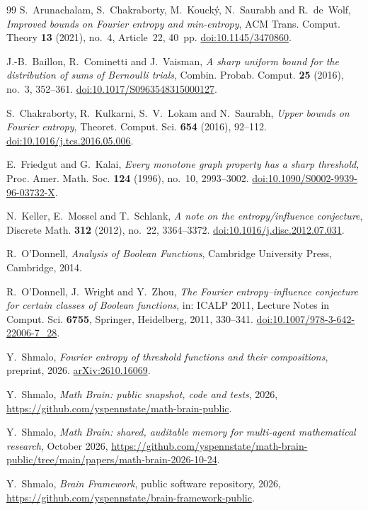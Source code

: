 \documentclass[11pt]{amsart}
\theoremstyle{definition}
\theoremstyle{remark}
\begin{document}
\begin{thebibliography}{99}
S.~Arunachalam, S.~Chakraborty, M.~Kouck\'y, N.~Saurabh and R.~de~Wolf,
\emph{Improved bounds on Fourier entropy and min-entropy},
ACM Trans. Comput. Theory \textbf{13} (2021), no.~4, Article~22, 40~pp.
\href{https://doi.org/10.1145/3470860}{doi:10.1145/3470860}.

J.-B.~Baillon, R.~Cominetti and J.~Vaisman,
\emph{A sharp uniform bound for the distribution of sums of Bernoulli trials},
Combin. Probab. Comput. \textbf{25} (2016), no.~3, 352--361.
\href{https://doi.org/10.1017/S0963548315000127}{doi:10.1017/S0963548315000127}.

S.~Chakraborty, R.~Kulkarni, S.~V.~Lokam and N.~Saurabh,
\emph{Upper bounds on Fourier entropy},
Theoret. Comput. Sci. \textbf{654} (2016), 92--112.
\href{https://doi.org/10.1016/j.tcs.2016.05.006}{doi:10.1016/j.tcs.2016.05.006}.

E.~Friedgut and G.~Kalai,
\emph{Every monotone graph property has a sharp threshold},
Proc. Amer. Math. Soc. \textbf{124} (1996), no.~10, 2993--3002.
\href{https://doi.org/10.1090/S0002-9939-96-03732-X}{doi:10.1090/S0002-9939-96-03732-X}.

N.~Keller, E.~Mossel and T.~Schlank,
\emph{A note on the entropy/influence conjecture},
Discrete Math. \textbf{312} (2012), no.~22, 3364--3372.
\href{https://doi.org/10.1016/j.disc.2012.07.031}{doi:10.1016/j.disc.2012.07.031}.

R.~O'Donnell,
\emph{Analysis of Boolean Functions},
Cambridge University Press, Cambridge, 2014.

R.~O'Donnell, J.~Wright and Y.~Zhou,
\emph{The Fourier entropy--influence conjecture for certain classes of Boolean functions},
in: ICALP 2011, Lecture Notes in Comput. Sci. \textbf{6755}, Springer, Heidelberg, 2011, 330--341.
\href{https://doi.org/10.1007/978-3-642-22006-7_28}{doi:10.1007/978-3-642-22006-7\_28}.

Y.~Shmalo,
\emph{Fourier entropy of threshold functions and their compositions},
preprint, 2026.
\href{https://arxiv.org/abs/2610.16069}{arXiv:2610.16069}.

 Y.~Shmalo, \emph{Math Brain: public snapshot, code and tests}, 2026, \url{https://github.com/yspennstate/math-brain-public}.

 Y.~Shmalo, \emph{Math Brain: shared, auditable memory for multi-agent mathematical research}, October 2026, \url{https://github.com/yspennstate/math-brain-public/tree/main/papers/math-brain-2026-10-24}.

 Y.~Shmalo, \emph{Brain Framework}, public software repository, 2026, \url{https://github.com/yspennstate/brain-framework-public}.
\end{thebibliography}
\end{document}
